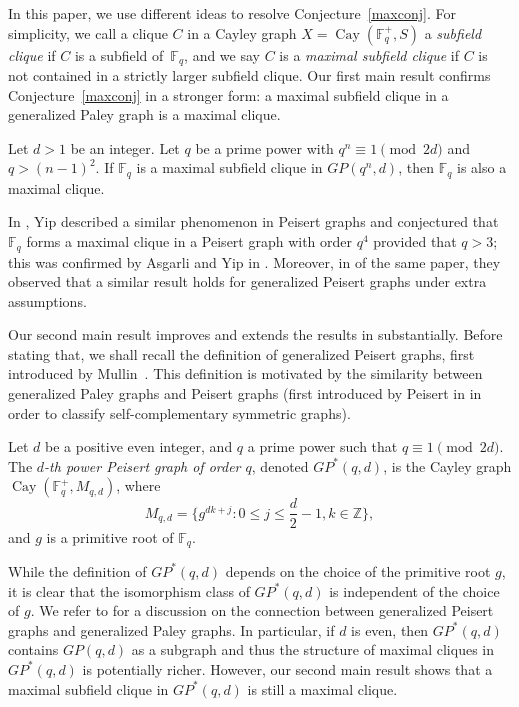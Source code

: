 \documentclass[Unicode,ALCO,published]{cedram}
\newcommand{\Z}{\mathbb{Z}}
\newcommand{\F}{\mathbb{F}}
\begin{document}
In this paper, we use different ideas to resolve Conjecture~\ref{maxconj}. For simplicity, we call a clique $C$ in a Cayley graph $X=\operatorname{Cay}(\F_q^+,S)$ a \emph{subfield clique} if $C$ is a subfield of~$\F_{q}$, and we say $C$ is a \emph{maximal subfield clique} if $C$ is not contained in a strictly larger subfield clique. Our first main result confirms Conjecture~\ref{maxconj} in a stronger form: a maximal subfield clique in a generalized Paley graph is a maximal clique. 

\begin{thm}\label{main1}
Let $d>1$ be an integer. Let $q$ be a prime power with $q^n \equiv 1 \pmod {2d}$ and $q>(n-1)^2$. If $\F_q$ is a maximal subfield clique in $GP(q^n,d)$, then $\F_q$ is also a maximal clique. 
\end{thm}

In \cite[Theorem 1.7]{Y22}, Yip described a similar phenomenon in Peisert graphs and conjectured that $\F_q$ forms a maximal clique in a Peisert graph with order $q^4$ provided that $q>3$; this was confirmed by Asgarli and Yip in \cite[Theorem 1.5]{AY}. Moreover, in \cite[Section 5]{AY} of the same paper, they observed that a similar result holds for generalized Peisert graphs under extra assumptions. 

Our second main result improves and extends the results in \cite[Section 5]{AY} substantially. Before stating that, we shall recall the definition of generalized Peisert graphs, first introduced by Mullin~\cite{NM}. This definition is motivated by the similarity between generalized Paley graphs and Peisert graphs (first introduced by Peisert in \cite{WP2} in order to classify self-complementary symmetric graphs).

\begin{defi}[{\cite[Definition 2.11]{AY}}]\rm
Let $d$ be a positive even integer, and $q$ a prime power such that $q \equiv 1 \pmod {2d}$. The {\em $d$-th power Peisert graph of order $q$}, denoted $GP^*(q,d)$, is the Cayley graph $\operatorname{Cay}(\F_q^+, M_{q,d})$, where
$$
M_{q,d}=\bigg\{g^{dk+j}: 0\leq j \leq \frac{d}{2}-1, k \in \Z\bigg\},
$$
and $g$ is a primitive root of $\F_q$.
\end{defi}

While the definition of $GP^*(q,d)$ depends on the choice of the primitive root $g$, it is clear that the isomorphism class of $GP^*(q,d)$ is independent of the choice of $g$. We refer to \cite[Remark 2.12]{AY} for a discussion on the connection between generalized Peisert graphs and generalized Paley graphs. In particular, if $d$ is even, then $GP^*(q,d)$ contains $GP(q,d)$ as a subgraph and thus the structure of maximal cliques in $GP^*(q,d)$ is potentially richer. However, our second main result shows that a maximal subfield clique in $GP^*(q,d)$ is still a maximal clique. 
\end{document}
